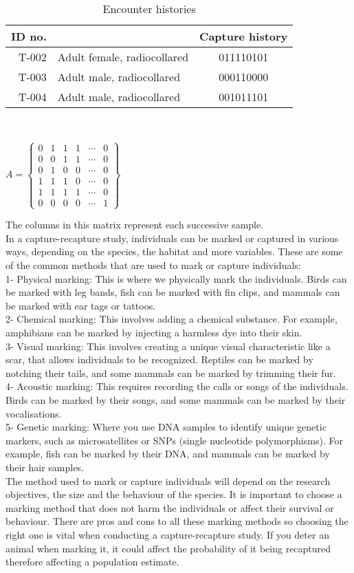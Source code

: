 \documentclass[,oneside]{article}
\numberwithin{equation}{section}
\begin{document}
\begin{table}[h]
\centering
\begin{tabular}{rlc}
\hline
ID no. && Capture history \\
\hline
T-002 & Adult female, radiocollared & 011110101 \\
T-003 & Adult male, radiocollared & 000110000 \\
T-004 & Adult male, radiocollared & 001011101
\end{tabular}
\caption{Encounter histories}
\label{tab:EncounterHistories}
\end{table}\\
\begin{center}
$
A = 
\begin{Bmatrix}
0 & 1 & 1 & 1 & \cdots & 0 \\
0 & 0 & 1 & 1 & \cdots & 0 \\
0 & 1 & 0 & 0 & \cdots & 0 \\
1 & 1 & 1 & 0 & \cdots & 0 \\
1 & 1 & 1 & 1 & \cdots & 0 \\
0 & 0 & 0 & 0 & \cdots & 1
\end{Bmatrix}$
\end{center}
The columns in this matrix represent each successive sample.\\
In a capture-recapture study, individuals can be marked or captured in various ways, depending on the species, the habitat and more variables. These are some of the common methods that are used to mark or capture individuals: \\
1- Physical marking: This is where we physically mark the individuals. Birds can be marked with leg bands, fish can be marked with fin clips, and mammals can be marked with ear tags or tattoos. \\
2- Chemical marking: This involves adding a chemical substance. For example, amphibians can be marked by injecting a harmless dye into their skin. \\
3- Visual marking: This involves creating a unique visual characteristic like a scar, that allows individuals to be recognized. Reptiles can be marked by notching their tails, and some mammals can be marked by trimming their fur. \\
4- Acoustic marking: This requires recording the calls or songs of the individuals. Birds can be marked by their songs, and some mammals can be marked by their vocalisations. \\
5- Genetic marking: Where you use DNA samples to identify unique genetic markers, such as microsatellites or SNPs (single nucleotide polymorphisms). For example, fish can be marked by their DNA, and mammals can be marked by their hair samples. \\
The method used to mark or capture individuals will depend on the research objectives, the size and the behaviour of the species. It is important to choose a marking method that does not harm the individuals or affect their survival or behaviour. There are pros and cons to all these marking methods so choosing the right one is vital when conducting a capture-recapture study. If you deter an animal when marking it, it could affect the probability of it being recaptured therefore affecting a population estimate.
\end{document}
